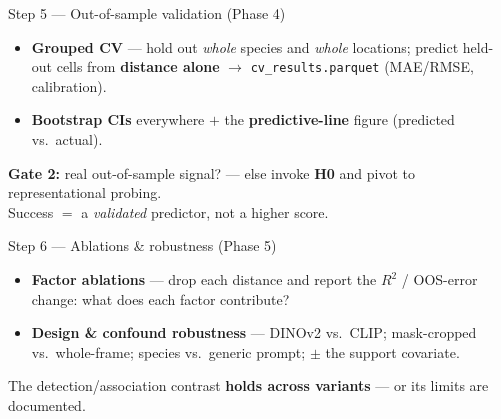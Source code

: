 \documentclass[aspectratio=169,11pt]{beamer}
\begin{document}
\begin{frame}{Step 5 --- Out-of-sample validation \small(Phase 4)}
  \begin{itemize}
    \item \textbf{Grouped CV} --- hold out \emph{whole} species and \emph{whole} locations; predict
          held-out cells from \textbf{distance alone} $\to$ \texttt{cv\_results.parquet} (MAE/RMSE, calibration).
    \item \textbf{Bootstrap CIs} everywhere $+$ the \textbf{predictive-line} figure (predicted vs.\ actual).
  \end{itemize}
  \vspace{0.2em}
  \centering\footnotesize\textcolor{burnt}{\textbf{Gate 2:} real out-of-sample signal? --- else invoke
  \textbf{H0} and pivot to representational probing.}\\[3pt]
  \footnotesize Success $=$ a \emph{validated} predictor, not a higher score.
\end{frame}

\begin{frame}{Step 6 --- Ablations \& robustness \small(Phase 5)}
  \begin{itemize}
    \item \textbf{Factor ablations} --- drop each distance and report the $R^2$ / OOS-error change:
          what does each factor contribute?
    \item \textbf{Design \& confound robustness} --- DINOv2 vs.\ CLIP; mask-cropped vs.\ whole-frame;
          species vs.\ generic prompt; $\pm$ the support covariate.
  \end{itemize}
  \vspace{0.3em}
  \centering\footnotesize The detection/association contrast \textbf{holds across variants} --- or its
  limits are documented.
\end{frame}
\end{document}
